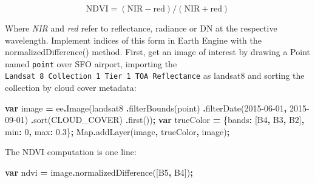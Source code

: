 \documentclass[
]{article}
\newenvironment{Shaded}{\begin{snugshade}}{\end{snugshade}}
\newcommand{\BuiltInTok}[1]{#1}
\newcommand{\DataTypeTok}[1]{\textcolor[rgb]{0.13,0.29,0.53}{#1}}
\newcommand{\DecValTok}[1]{\textcolor[rgb]{0.00,0.00,0.81}{#1}}
\newcommand{\FloatTok}[1]{\textcolor[rgb]{0.00,0.00,0.81}{#1}}
\newcommand{\FunctionTok}[1]{\textcolor[rgb]{0.00,0.00,0.00}{#1}}
\newcommand{\KeywordTok}[1]{\textcolor[rgb]{0.13,0.29,0.53}{\textbf{#1}}}
\newcommand{\NormalTok}[1]{#1}
\newcommand{\OperatorTok}[1]{\textcolor[rgb]{0.81,0.36,0.00}{\textbf{#1}}}
\newcommand{\StringTok}[1]{\textcolor[rgb]{0.31,0.60,0.02}{#1}}
\begin{document}
\[ \text{NDVI} = (\text{NIR} - \text{red}) / (\text{NIR} + \text{red}) \]

Where \emph{NIR} and \emph{red} refer to reflectance, radiance or DN at the respective wavelength. Implement indices of this form in Earth Engine with the normalizedDifference() method. First, get an image of interest by drawing a Point named \texttt{point} over SFO airport, importing the \texttt{Landsat\ 8\ Collection\ 1\ Tier\ 1\ TOA\ Reflectance} as landsat8 and sorting the collection by cloud cover metadata:

\begin{Shaded}
\begin{Highlighting}[]
\KeywordTok{var}\NormalTok{  image }\OperatorTok{=}\NormalTok{ ee}\OperatorTok{.}\FunctionTok{Image}\NormalTok{(landsat8     }
                      \OperatorTok{.}\FunctionTok{filterBounds}\NormalTok{(point)     }
                      \OperatorTok{.}\FunctionTok{filterDate}\NormalTok{(}\StringTok{\textquotesingle{}2015{-}06{-}01\textquotesingle{}}\OperatorTok{,} \StringTok{\textquotesingle{}2015{-}09{-}01\textquotesingle{}}\NormalTok{)}
                      \OperatorTok{.}\FunctionTok{sort}\NormalTok{(}\StringTok{\textquotesingle{}CLOUD\_COVER\textquotesingle{}}\NormalTok{)}
                      \OperatorTok{.}\FunctionTok{first}\NormalTok{())}\OperatorTok{;}
\KeywordTok{var}\NormalTok{ trueColor }\OperatorTok{=}\NormalTok{ \{}\DataTypeTok{bands}\OperatorTok{:}\NormalTok{ [}\StringTok{\textquotesingle{}B4\textquotesingle{}}\OperatorTok{,} \StringTok{\textquotesingle{}B3\textquotesingle{}}\OperatorTok{,} \StringTok{\textquotesingle{}B2\textquotesingle{}}\NormalTok{]}\OperatorTok{,} 
                 \DataTypeTok{min}\OperatorTok{:} \DecValTok{0}\OperatorTok{,} \DataTypeTok{max}\OperatorTok{:} \FloatTok{0.3}\NormalTok{\}}\OperatorTok{;}   
\BuiltInTok{Map}\OperatorTok{.}\FunctionTok{addLayer}\NormalTok{(image}\OperatorTok{,}\NormalTok{ trueColor}\OperatorTok{,} \StringTok{\textquotesingle{}image\textquotesingle{}}\NormalTok{)}\OperatorTok{;}  
\end{Highlighting}
\end{Shaded}

The NDVI computation is one line:

\begin{Shaded}
\begin{Highlighting}[]
\KeywordTok{var}\NormalTok{  ndvi }\OperatorTok{=}\NormalTok{ image}\OperatorTok{.}\FunctionTok{normalizedDifference}\NormalTok{([}\StringTok{\textquotesingle{}B5\textquotesingle{}}\OperatorTok{,} \StringTok{\textquotesingle{}B4\textquotesingle{}}\NormalTok{])}\OperatorTok{;}  
\end{Highlighting}
\end{Shaded}
\end{document}

